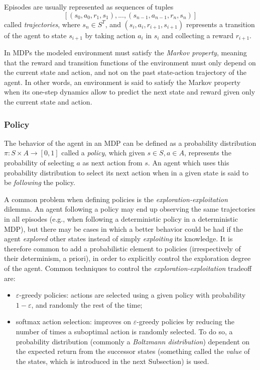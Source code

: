Episodes are usually represented as sequences of tuples 
\[
    [(s_0, a_0, r_1, s_1), ..., (s_{n-1}, a_{n-1}, r_n, s_n)]
\]
called \textit{trajectories}, where $s_n \in S^T$, and $(s_i, a_i, r_{i+1}, s_{i+1})$ 
represents a transition of the agent to state $s_{i+1}$ by taking action $a_i$ 
in $s_i$ and collecting a reward $r_{i+1}$.

In MDPs the modeled environment must satisfy the \textit{Markov property}, 
meaning that the reward and transition functions of the environment must only 
depend on the current state and action, and not on the past state-action 
trajectory of the agent.
In other words, an environment is said to satisfy the Markov property when its 
one-step dynamics allow to predict the next state and reward given only the 
current state and action.

\subsubsection{Policy}
The behavior of the agent in an MDP can be defined as a probability 
distribution $\pi: S \times A \rightarrow [0,1]$ called a \textit{policy}, 
which given $s \in S, a \in A$, represents the probability of selecting $a$ as 
next action from $s$.
An agent which uses this probability distribution to select its next action 
when in a given state is said to be \textit{following} the policy.

A common problem when defining policies is the \textit{exploration-exploitation}
dilemma. An agent following a policy may end up observing the same trajectories 
in all episodes (e.g., when following a deterministic policy in a deterministic 
MDP), but there may be cases in which a better behavior could be had if the agent
\textit{explored} other states instead of simply \textit{exploiting} its 
knowledge. 
It is therefore common to add a probabilistic element to policies (irrespectively
of their determinism, a priori), in order to explicitly control the exploration
degree of the agent. Common techniques to control the 
\textit{exploration-exploitation} tradeoff are:
%
\begin{itemize}
    \item $\varepsilon$-greedy policies: actions are selected using a given 
    policy with probability $1-\varepsilon$, and randomly the rest of the time;
    \item softmax action selection: improves on $\varepsilon$-greedy policies by 
    reducing the number of times a suboptimal action is randomly selected. To do
    so, a probability distribution (commonly a \textit{Boltzmann distribution}) 
    dependent on the expected return from the successor states (something called
    the \textit{value} of the states, which is introduced in the next Subsection)
    is used.
\end{itemize}
%
